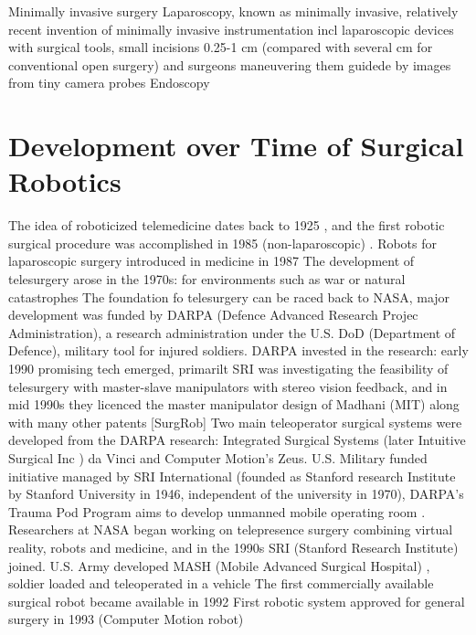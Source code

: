 Minimally invasive surgery
Laparoscopy, known as minimally invasive, relatively recent invention of minimally invasive instrumentation incl laparoscopic devices with surgical tools, small incisions 0.25-1 cm (compared with several cm for conventional open surgery) and surgeons maneuvering them guidede by images from tiny camera probes
Endoscopy



\section{Development over Time of Surgical Robotics}
The idea of roboticized telemedicine dates back to 1925 \citep{bib:telemed_predict}, and the first robotic surgical procedure was accomplished in 1985 (non-laparoscopic) \citep{bib:telesurg_history}. %
Robots for laparoscopic surgery introduced in medicine in 1987 \citep{bib:brown_univ}
The development of telesurgery arose in the 1970s: for environments such as war or natural catastrophes
The foundation fo telesurgery can be raced back to NASA, major development was funded by DARPA (Defence Advanced Research Projec Administration), a research administration under the U.S. DoD (Department of Defence), military tool for injured soldiers.
DARPA invested in the research: early 1990 promising tech emerged, primarilt SRI was investigating the feasibility of telesurgery with master-slave manipulators with stereo vision feedback, and in mid 1990s they licenced the master manipulator design of Madhani (MIT) along with many other patents [SurgRob]
Two main teleoperator surgical systems were developed from the DARPA research: Integrated Surgical Systems (later Intuitive Surgical Inc \citep{bib:brown_univ}) da Vinci and Computer Motion's Zeus. \citep{bib:telesurg_history}
U.S. Military funded initiative managed by SRI International (founded as Stanford research Institute by Stanford University in 1946, independent of the university in 1970), DARPA's Trauma Pod Program aims to develop unmanned mobile operating room \citep{bib:docatadist}.
Researchers at NASA began working on telepresence surgery combining virtual reality, robots and medicine, and in the 1990s SRI (Stanford Research Institute) joined. \citep{bib:brown_univ}
U.S. Army developed MASH (Mobile Advanced Surgical Hospital) \citep{bib:brown_univ}, soldier loaded and teleoperated in a vehicle
The first commercially available surgical robot became available in 1992\citep{bib:telesurg_history}
First robotic system approved for general surgery in 1993 (Computer Motion robot) \citep{bib:telesurg_history}

